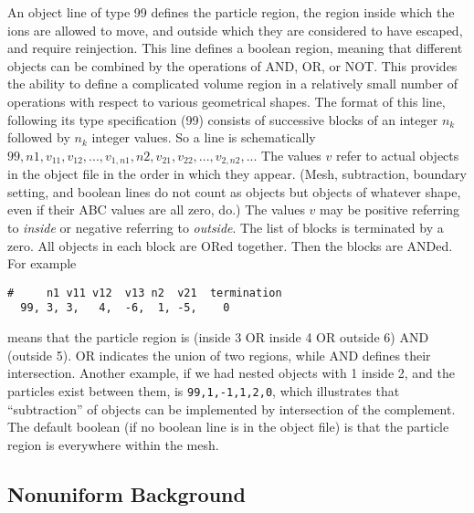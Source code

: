 \documentclass[12pt]{article}
\begin{document}
An object line of type 99 defines the particle region, the region
inside which the ions are allowed to move, and outside which they are
considered to have escaped, and require reinjection. This line defines
a boolean region, meaning that different objects can be combined by
the operations of AND, OR, or NOT. This provides the ability to define
a complicated volume region in a relatively small number of operations
with respect to various geometrical shapes. The format of this line,
following its type specification (99) consists of successive blocks of
an integer $n_k$ followed by $n_k$ integer values. So a line is
schematically
$99,n1,v_{11},v_{12},...,v_{1,n1},n2,v_{21},v_{22},...,v_{2,n2},...$
The values $v$ refer to actual objects in the object file in the order
in which they appear. (Mesh, subtraction, boundary setting, and boolean lines do
not count as objects but objects of whatever shape, even if their ABC
values are all zero, do.)  The values $v$ may be positive referring to
\emph{inside} or negative referring to \emph{outside}. The list of
blocks is terminated by a zero. All objects in each block are ORed
together. Then the blocks are ANDed. For example
\begin{verbatim}
#     n1 v11 v12  v13 n2  v21  termination
  99, 3, 3,   4,  -6,  1, -5,    0
\end{verbatim}
means that the particle region is (inside 3 OR inside 4 OR outside 6)
AND (outside 5). OR indicates the union of two regions, while AND defines
their intersection. Another example, if we had nested objects with 1
inside 2, and the particles exist between them, is
\verb!99,1,-1,1,2,0!, which illustrates that ``subtraction'' of
objects can be implemented by intersection of the complement.  The
default boolean (if no boolean line is in the object file) is that the
particle region is everywhere within the mesh.


\subsection{Nonuniform Background}
\end{document}
